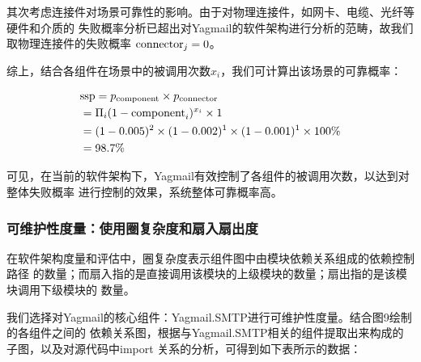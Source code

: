 \documentclass[UTF8,12pt,a4paper]{ctexart}
\begin{document}
    其次考虑连接件对场景可靠性的影响。由于对物理连接件，如网卡、电缆、光纤等硬件和介质的
    失败概率分析已超出对Yagmail的软件架构进行分析的范畴，故我们取物理连接件的失败概率
    ${\rm connector}_j=0$。
    
    综上，结合各组件在场景中的被调用次数$x_i$，我们可计算出该场景的可靠概率：
    
    \begin{equation}
    \begin{aligned}
        & {\rm ssp} = p_{\rm component} \times p_{\rm connector}\\
        & =\Pi_i(1-{\rm component}_i)^{x_i} \times 1\\
        & =(1-0.005)^2 \times (1-0.002)^1 \times (1-0.001)^1 \times 100\%\\
        & =98.7\%
    \end{aligned}
    \end{equation}

    可见，在当前的软件架构下，Yagmail有效控制了各组件的被调用次数，以达到对整体失败概率
    进行控制的效果，系统整体可靠概率高。

    \subsubsection{可维护性度量：使用圈复杂度和扇入扇出度}

    在软件架构度量和评估中，圈复杂度表示组件图中由模块依赖关系组成的依赖控制路径
    的数量；而扇入指的是直接调用该模块的上级模块的数量；扇出指的是该模块调用下级模块的
    数量。
    
    我们选择对Yagmail的核心组件：Yagmail.SMTP进行可维护性度量。结合图9绘制的各组件之间的
    依赖关系图，根据与Yagmail.SMTP相关的组件提取出来构成的子图，以及对源代码中import
    关系的分析，可得到如下表所示的数据：
    
\end{document}
